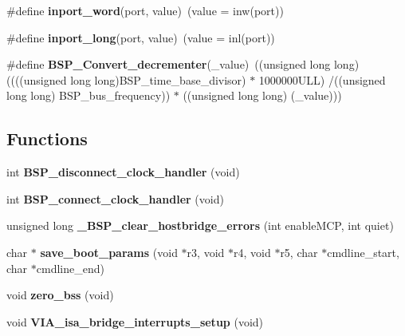 \begin{DoxyCompactItemize}
\#define {\bfseries inport\+\_\+word}(port,  value)~(value = inw(port))
\item 
\mbox{\label{group__RTEMSBSPsPowerPCMotorola_gae9712cc16f2e393f4c4e317b547631b5}} 
\#define {\bfseries inport\+\_\+long}(port,  value)~(value = inl(port))
\item 
\mbox{\label{group__RTEMSBSPsPowerPCMotorola_ga5b3b7a8f2f89a6110c93e0229f67c104}} 
\#define {\bfseries B\+S\+P\+\_\+\+Convert\+\_\+decrementer}(\+\_\+value)~((unsigned long long) ((((unsigned long long)B\+S\+P\+\_\+time\+\_\+base\+\_\+divisor) $\ast$ 1000000\+U\+L\+L) /((unsigned long long) B\+S\+P\+\_\+bus\+\_\+frequency)) $\ast$ ((unsigned long long) (\+\_\+value)))
\end{DoxyCompactItemize}
\subsection*{Functions}
\begin{DoxyCompactItemize}
\item 
\mbox{\label{group__RTEMSBSPsPowerPCMotorola_ga5b6f7a1b73b76ef80251fd770905d0c1}} 
int {\bfseries B\+S\+P\+\_\+disconnect\+\_\+clock\+\_\+handler} (void)
\item 
\mbox{\label{group__RTEMSBSPsPowerPCMotorola_ga7e99fec6e3bd9986094a2de9cc0b110a}} 
int {\bfseries B\+S\+P\+\_\+connect\+\_\+clock\+\_\+handler} (void)
\item 
\mbox{\label{group__RTEMSBSPsPowerPCMotorola_ga9365175934c534169a41c05950c05fcd}} 
unsigned long {\bfseries \+\_\+\+B\+S\+P\+\_\+clear\+\_\+hostbridge\+\_\+errors} (int enable\+M\+CP, int quiet)
\item 
\mbox{\label{group__RTEMSBSPsPowerPCMotorola_ga127266abfcf87d5e48d649092e2951e9}} 
char $\ast$ {\bfseries save\+\_\+boot\+\_\+params} (void $\ast$r3, void $\ast$r4, void $\ast$r5, char $\ast$cmdline\+\_\+start, char $\ast$cmdline\+\_\+end)
\item 
\mbox{\label{group__RTEMSBSPsPowerPCMotorola_gaa1c249f197a325121cc9678b1665c29b}} 
void {\bfseries zero\+\_\+bss} (void)
\item 
\mbox{\label{group__RTEMSBSPsPowerPCMotorola_ga9f67dd1b18840d3354081aa70e2b0750}} 
void {\bfseries V\+I\+A\+\_\+isa\+\_\+bridge\+\_\+interrupts\+\_\+setup} (void)
\end{DoxyCompactItemize}
